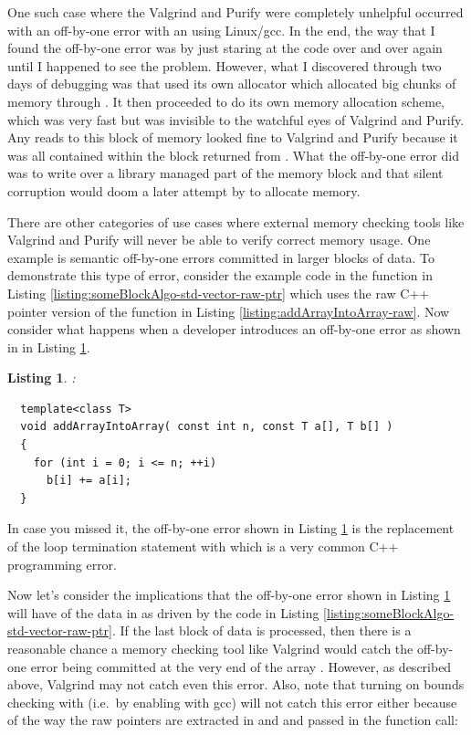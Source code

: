 \documentclass[pdf,ps2pdf,11pt]{SANDreport}
\newtheorem{listing}{Listing}
\begin{document}
One such case where the Valgrind and Purify were completely unhelpful
occurred with an off-by-one error with an {} using
Linux/gcc.  In the end, the way that I found the off-by-one error was
by just staring at the code over and over again until I happened to
see the problem.  However, what I discovered through two days of
debugging was that {} used its own allocator which
allocated big chunks of memory through {}.  It
then proceeded to do its own memory allocation scheme, which was very
fast but was invisible to the watchful eyes of Valgrind and Purify.
Any reads to this block of memory looked fine to Valgrind and Purify
because it was all contained within the block returned from
{}.  What the off-by-one error did was to write
over a library managed part of the memory block and that silent
corruption would doom a later attempt by {} to
allocate memory.

There are other categories of use cases where external memory checking
tools like Valgrind and Purify will never be able to verify correct
memory usage.  One example is semantic off-by-one errors committed in
larger blocks of data.  To demonstrate this type of error, consider
the example code in the function {} in
Listing {}\ref{listing:someBlockAlgo-std-vector-raw-ptr} which uses
the raw C++ pointer version of the function
{} in Listing
{}\ref{listing:addArrayIntoArray-raw}.  Now consider what happens when
a developer introduces an off-by-one error as shown in
{} in Listing
{}\ref{listing:addArrayIntoArray_rawError}.

\begin{listing}:\\
\label{listing:addArrayIntoArray_rawError}
{\small\begin{verbatim}
  template<class T>
  void addArrayIntoArray( const int n, const T a[], T b[] )
  {
    for (int i = 0; i <= n; ++i)
      b[i] += a[i];
  }
\end{verbatim}}
\end{listing}

In case you missed it, the off-by-one error shown in Listing
{}\ref{listing:addArrayIntoArray_rawError} is the replacement of the
loop termination statement {} with {}
which is a very common C++ programming error.

Now let's consider the implications that the off-by-one error shown in
Listing {}\ref{listing:addArrayIntoArray_rawError} will have of the
data in {} as driven by the code in Listing
{}\ref{listing:someBlockAlgo-std-vector-raw-ptr}.  If the last block
{} of data is processed, then there is a
reasonable chance a memory checking tool like Valgrind would catch the
off-by-one error being committed at the very end of the array
{}.  However, as described above, Valgrind may not
catch even this error.  Also, note that turning on bounds checking
with {} (i.e.\ by enabling
{} with gcc) will not catch this error
either because of the way the raw pointers are extracted in and and
passed in the function call:
\end{document}
